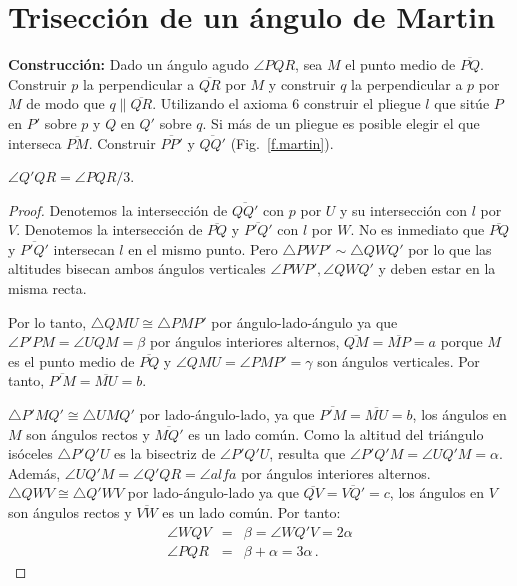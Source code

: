 \section{Trisección de un ángulo de Martin}\label{s.martin-trisection}

\noindent\textbf{Construcción:}
Dado un ángulo agudo $\angle PQR$, sea $M$ el punto medio de $\overline{PQ}$. Construir $p$ la perpendicular a $\overline{QR}$ por $M$ y construir $q$ la perpendicular a $p$ por $M$ de modo que $q\parallel\overline{QR}$. Utilizando el axioma 6 construir el pliegue $l$ que sitúe $P$ en $P'$ sobre $p$ y $Q$ en $Q'$ sobre $q$. Si más de un pliegue es posible elegir el que interseca $\overline{PM}$. Construir $\overline{PP'}$ y $\overline{QQ'}$  (Fig.~\ref{f.martin}).

\begin{theorem}
$\angle Q'QR=\angle PQR/3$.
\end{theorem}
\begin{proof}
Denotemos la intersección de $\overline{QQ'}$ con $p$ por $U$ y su intersección con $l$ por $V$. Denotemos la intersección de $\overline{PQ}$ y $\overline{P'Q'}$ con $l$ por $W$. No es inmediato que $\overline{PQ}$ y $\overline{P'Q'}$ intersecan $l$ en el mismo punto. Pero $\triangle PWP' \sim \triangle QWQ'$ por lo que las altitudes bisecan ambos ángulos verticales $\angle PWP', \angle QWQ'$ y deben estar en la misma recta.

Por lo tanto, $\triangle QMU\cong \triangle PMP'$ por ángulo-lado-ángulo ya que $\angle P'PM=\angle UQM=\beta$ por ángulos interiores alternos, $\overline{QM}=\overline{MP}=a$ porque $M$ es el punto medio de $\overline{PQ}$ y $\angle QMU=\angle PMP'=\gamma$ son ángulos verticales. Por tanto, $\overline{P'M}=\overline{MU}=b$.

$\triangle P'MQ'\cong \triangle UMQ'$ por lado-ángulo-lado, ya que $\overline{P'M}=\overline{MU}=b$, los ángulos en $M$ son ángulos rectos y $\overline{MQ'}$ es un lado común. Como la altitud del triángulo isóceles $\triangle P'Q'U$ es la bisectriz de $\angle P'Q'U$, resulta que $\angle P'Q'M=\angle UQ'M=\alpha$. Además, $\angle UQ'M=\angle Q'QR=\angle alfa$ por ángulos interiores alternos. $\triangle QWV\cong\triangle Q'WV$ por lado-ángulo-lado ya que $\overline{QV}=\overline{VQ'}=c$, los ángulos en $V$ son ángulos rectos y $\overline{VW}$ es un lado común. Por tanto:
\begin{eqnarray*}
\angle WQV&=&\beta=\angle WQ'V=2\alpha\\
\angle PQR &=& \beta + \alpha = 3\alpha\,.
\end{eqnarray*}
\end{proof}

